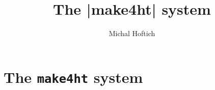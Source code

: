 \documentclass{ltxdoc}
\title{The |make4ht| system}
\author{Michal Hoftich}
\begin{document}
\maketitle
\tableofcontents
\section{The \texttt{make4ht} system}



\end{document}
